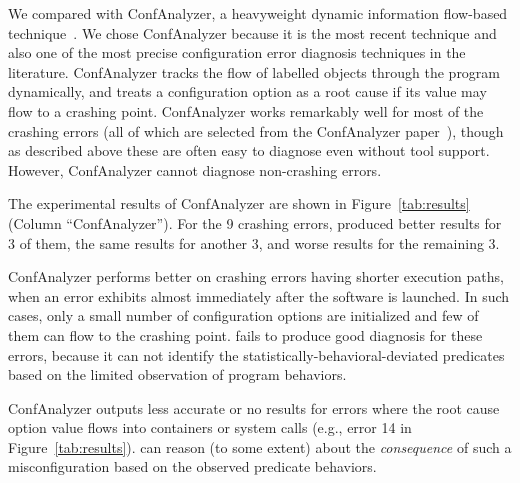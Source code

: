 We compared \ourtool with ConfAnalyzer, a heavyweight dynamic information
flow-based technique~\cite{Rabkin:2011:PPC}.
We chose ConfAnalyzer because it is the most recent technique and
also one of the most precise configuration error diagnosis techniques
in the literature.
ConfAnalyzer tracks the flow of labelled objects through the
program dynamically,
and treats a configuration option as a root cause if its
value may flow to a crashing point.
ConfAnalyzer works remarkably well for most of the crashing errors (all of
which are selected from the ConfAnalyzer paper~\cite{Rabkin:2011:PPC}), though as
described above these are often easy to diagnose even without tool
support. However, ConfAnalyzer cannot diagnose non-crashing errors.

The experimental results of ConfAnalyzer are shown in Figure~\ref{tab:results} (Column ``ConfAnalyzer'').
For the 9 crashing errors, \ourtool produced better results for 3 of them,
the same results for another 3, and worse results for the remaining 3.

ConfAnalyzer performs better on crashing errors
having shorter execution paths, when an error exhibits
almost immediately after the software is launched.
In such cases, only a small number of configuration options are initialized and
few of them can flow to the crashing point. 
\ourtool fails to produce good diagnosis for these errors, because it can not identify
 the statistically-behavioral-deviated predicates based on the limited
observation of program behaviors.

ConfAnalyzer outputs less accurate or no results
for errors where the root cause option value
flows into containers or system calls (e.g., error 14 in Figure~\ref{tab:results}).
\ourtool can reason (to some extent) about the \textit{consequence} of
such a misconfiguration based on the observed predicate behaviors.






